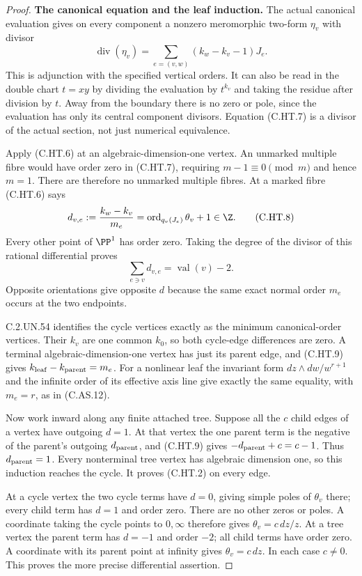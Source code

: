 \begin{proof}
\par\medskip\noindent\textbf{The canonical equation and the leaf induction.}
The actual canonical evaluation gives on every component a
nonzero meromorphic two-form $\eta_v$ with divisor
\[
 \operatorname{div}(\eta_v)
       =\sum_{e=(v,w)}(k_w-k_v-1)J_e .                 \tag{C.HT.7}
\]
This is adjunction with the specified vertical orders. It can also
be read in the double chart $t=xy$ by dividing the evaluation by
$t^{k_v}$ and taking the residue after division by $t$. Away from
the boundary there is no zero or pole, since the evaluation has
only its central component divisors. Equation (C.HT.7) is a divisor
of the actual section, not just numerical equivalence.

Apply (C.HT.6) at an algebraic-dimension-one vertex. An unmarked
multiple fibre would have order zero in (C.HT.7), requiring
$m-1\equiv0\pmod m$ and hence $m=1$. There are therefore no
unmarked multiple fibres. At a marked fibre (C.HT.6) says
\[
 d_{v,e}:=\frac{k_w-k_v}{m_e}
       =\operatorname{ord}_{q_v(J_e)}\theta_v+1\in\Z.
                                                        \tag{C.HT.8}
\]
Every other point of $\PP^1$ has order zero. Taking the degree of
the divisor of this rational differential proves
\[
                    \sum_{e\ni v}d_{v,e}
                           =\operatorname{val}(v)-2.   \tag{C.HT.9}
\]
Opposite orientations give opposite $d$ because the same exact
normal order $m_e$ occurs at the two endpoints.

C.2.UN.54 identifies the cycle vertices exactly as the minimum
canonical-order vertices. Their $k_v$ are one common $k_0$,
so both cycle-edge differences are zero. A terminal
algebraic-dimension-one vertex has just its parent edge, and
(C.HT.9) gives $k_{\rm leaf}-k_{\rm parent}=m_e$.
For a nonlinear leaf the invariant form
$dz\wedge dw/w^{r+1}$ and the infinite order of its effective
axis line give exactly the same equality, with $m_e=r$,
as in (C.AS.12).

Now work inward along any finite attached tree. Suppose all the
$c$ child edges of a vertex have outgoing $d=1$. At that vertex
the one parent term is the negative of the parent's outgoing
$d_{\rm parent}$, and (C.HT.9) gives
$-d_{\rm parent}+c=c-1$. Thus $d_{\rm parent}=1$.
Every nonterminal tree vertex has algebraic dimension one, so this
induction reaches the cycle. It proves (C.HT.2) on every edge.

At a cycle vertex the two cycle terms have $d=0$, giving simple
poles of $\theta_v$ there; every child term has $d=1$ and order
zero. There are no other zeros or poles. A coordinate taking the
cycle points to $0,\infty$ therefore gives $\theta_v=c\,dz/z$.
At a tree vertex the parent term has $d=-1$ and order $-2$;
all child terms have order zero. A coordinate with its parent
point at infinity gives $\theta_v=c\,dz$. In each case $c\ne0$.
This proves the more precise differential assertion.


\end{proof}
